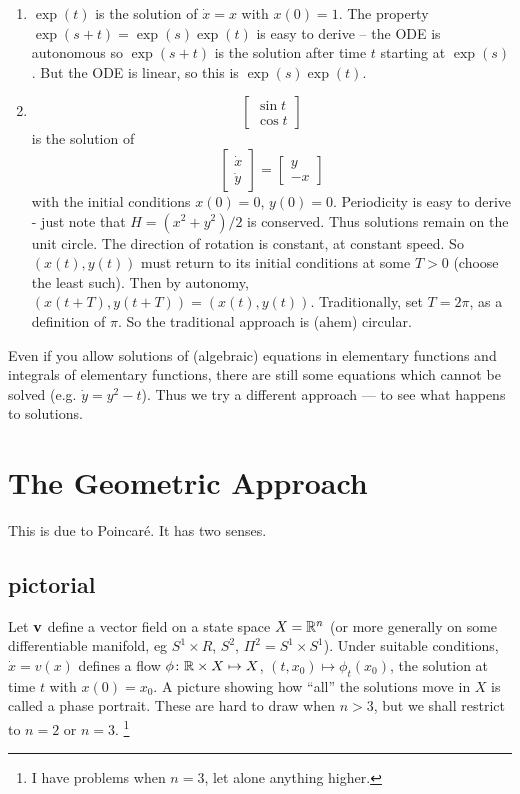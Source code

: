 \documentclass{notes}
\theoremstyle{plain}
\begin{document}
\begin{enumerate}
\item $\exp(t)$ is the solution of $\dot{x} = x$ with $x(0) = 1$.  The
  property $\exp(s+t) = \exp(s) \exp(t)$ is easy to derive -- the ODE
  is autonomous so $\exp(s+t)$ is the solution after time $t$ starting
  at $\exp(s)$.  But the ODE is linear, so this is $\exp(s) \exp(t)$.
  
\item

\[
\left[ \begin{matrix} \sin t \\ \cos t \end{matrix} \right]
\]
is the solution of
\[
\left[ \begin{matrix} \dot{x} \\ \dot{y} \end{matrix} \right] = \left[
  \begin{matrix} y \\ -x \end{matrix} \right]
\]
with the initial conditions $x(0) = 0$, $y(0) = 0$.  Periodicity is
easy to derive - just note that $H = (x^2 + y^2) / 2$ is conserved.
Thus solutions remain on the unit circle.  The direction of rotation
is constant, at constant speed.  So $\left(x(t),y(t)\right)$ must
return to its initial conditions at some $T > 0$ (choose the least
such).  Then by autonomy, $\left(x(t+T),y(t+T)\right) =
\left(x(t),y(t)\right)$.  Traditionally, set $T = 2 \pi$, as a
definition of $\pi$.  So the traditional approach is (ahem) circular.
\end{enumerate}

Even if you allow solutions of (algebraic) equations in elementary
functions and integrals of elementary functions, there are still some
equations which cannot be solved (e.g. $\dot{y} = y^2 - t$).  Thus we
try a different approach --- to see what happens to solutions.

\section{The Geometric Approach}

This is due to Poincar\'e.  It has two senses.

\subsection*{pictorial}

Let $\mathbf{v}$ define a vector field on a state space $X = \mathbb{R}^n$ (or
more generally on some differentiable manifold, eg $S^1 \times R$,
$S^2$, $\Pi^2 = S^1 \times S^1$).  Under suitable conditions, $\dot{x}
= v(x)$ defines a flow $\phi \colon \mathbb{R} \times X \mapsto X$, $(t,x_0)
\mapsto \phi_t(x_0)$, the solution at time $t$ with $x(0) = x_0$.  A
picture showing how ``all'' the solutions move in $X$ is called a
phase portrait.  These are hard to draw when $n > 3$, but we shall
restrict to $n=2$ or $n=3$.%
\footnote{I have problems when $n=3$, let alone anything higher.}
\end{document}
